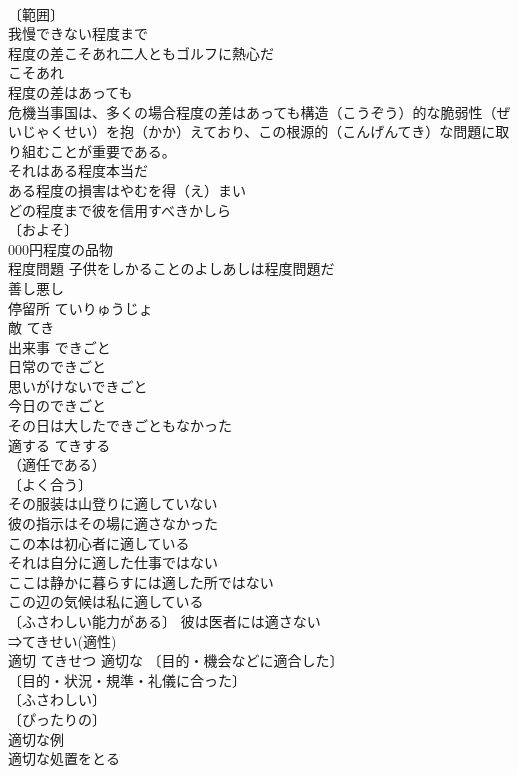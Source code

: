 \documentclass[8pt]{extreport}
\begin{document}
\begin{CJK}{UTF8}{min}
\\	〔範囲〕
\\	我慢できない程度まで 
\\	程度の差こそあれ二人ともゴルフに熱心だ 
\\	こそあれ　
\\	程度の差はあっても　
\\	危機当事国は、多くの場合程度の差はあっても構造（こうぞう）的な脆弱性（ぜいじゃくせい）を抱（かか）えており、この根源的（こんげんてき）な問題に取り組むことが重要である。 
\\	それはある程度本当だ 
\\	ある程度の損害はやむを得（え）まい 
\\	どの程度まで彼を信用すべきかしら 
\\	〔およそ〕 
\\	000円程度の品物 
\\	程度問題 子供をしかることのよしあしは程度問題だ 
\\	善し悪し　
\\	停留所	ていりゅうじょ	
\\	敵	てき	
\\	出来事	できごと	
\\	日常のできごと 
\\	思いがけないできごと 
\\	今日のできごと 
\\	その日は大したできごともなかった 
\\	適する	てきする	
\\	（適任である）
\\	〔よく合う〕
\\	その服装は山登りに適していない 
\\	彼の指示はその場に適さなかった 
\\	この本は初心者に適している 
\\	それは自分に適した仕事ではない 
\\	ここは静かに暮らすには適した所ではない 
\\	この辺の気候は私に適している 
\\	〔ふさわしい能力がある〕 彼は医者には適さない 
\\	⇒てきせい(適性)
\\	適切	てきせつ	適切な 〔目的・機会などに適合した〕
\\	〔目的・状況・規準・礼儀に合った〕
\\	〔ふさわしい〕
\\	〔ぴったりの〕
\\	適切な例 
\\	適切な処置をとる 

\end{CJK}
\end{document}
